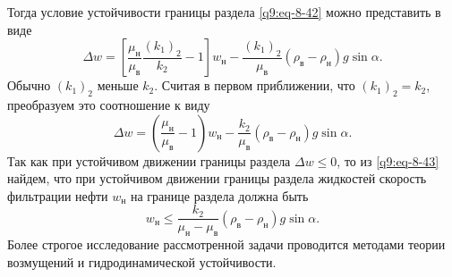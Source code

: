 Тогда условие устойчивости границы раздела \eqref{q9:eq-8-42} можно представить в виде
\[
\Delta w=\left[\frac{\mu_\text{н}}{\mu_\text{в}}\frac{(k_1)_2}{k_2}-1\right]w_\text{н}-\frac{(k_1)_2}{\mu_\text{в}}(\rho_\text{в}-\rho_\text{н})g\sin\alpha.
\]
Обычно $(k_1)_2$ меньше $k_2$. Считая в первом приближении, что $(k_1)_2=k_2$, преобразуем это соотношение к виду
\begin{equation}\Delta w=\left(\frac{\mu_\text{н}}{\mu_\text{в}}-1\right)w_\text{н}-\frac{k_2}{\mu_\text{в}}(\rho_\text{в}-\rho_\text{н})g\sin\alpha.\tag{8.43}\label{q9:eq-8-43}\end{equation}
Так как при устойчивом движении границы раздела $\Delta w\le0$, то из \eqref{q9:eq-8-43} найдем, что при устойчивом движении границы раздела жидкостей скорость фильтрации нефти $w_\text{н}$ на границе раздела должна быть
\[
w_\text{н}\le\frac{k_2}{\mu_\text{н}-\mu_\text{в}}(\rho_\text{в}-\rho_\text{н})g\sin\alpha.
\]
Более строгое исследование рассмотренной задачи проводится методами теории возмущений и гидродинамической устойчивости.
